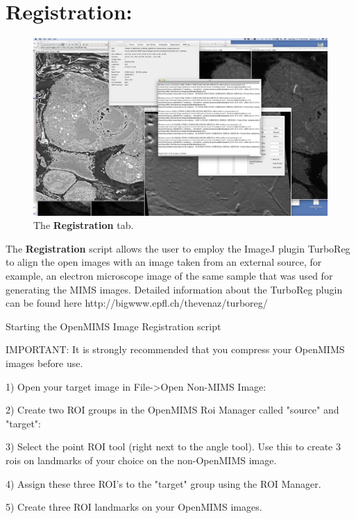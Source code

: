 \documentclass{article}
\begin{document}
	
	
	
	
\newpage
\section*{Registration:}
	
	\begin{figure}[ht]
	\centering
	\includegraphics[scale=0.70]{snapshotRegistration.png}
	\caption{The \textbf{Registration} tab.}
	\end{figure}
	The \textbf{Registration} script allows the user to employ the ImageJ plugin TurboReg to align the open images with an image taken from an external source, for example, an electron microscope image of the same sample that was used for generating the MIMS images.   Detailed information about the TurboReg plugin can be found here http://bigwww.epfl.ch/thevenaz/turboreg/
	
	


	Starting the OpenMIMS Image Registration script


IMPORTANT: It is strongly recommended that you compress your OpenMIMS images before use.

1) Open your target image in File->Open Non-MIMS Image:

2) Create two ROI groups in the OpenMIMS Roi Manager called "source" and "target":

3) Select the point ROI tool (right next to the angle tool). Use this to create 3 rois on landmarks of your choice on the non-OpenMIMS image.

4) Assign these three ROI's to the "target" group using the ROI Manager.

5) Create three ROI landmarks on your OpenMIMS images. 
\end{document}
